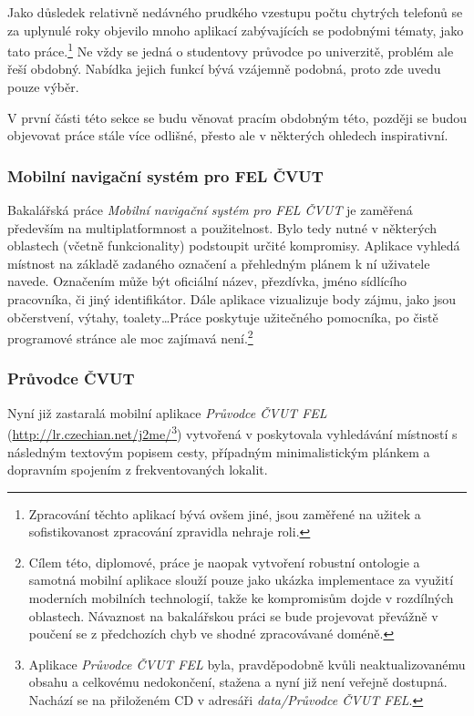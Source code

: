 Jako důsledek relativně nedávného prudkého vzestupu počtu chytrých telefonů se za uplynulé roky objevilo mnoho aplikací zabývajících se podobnými tématy, jako tato práce.\footnote{Zpracování těchto aplikací bývá ovšem jiné, jsou zaměřené na užitek a sofistikovanost zpracování zpravidla nehraje roli.} Ne vždy se jedná o studentovy průvodce po univerzitě, problém ale řeší obdobný. Nabídka jejich funkcí bývá vzájemně podobná, proto zde uvedu pouze výběr.

V první části této sekce se budu věnovat pracím obdobným této, později se budou objevovat práce stále více odlišné, přesto ale v některých ohledech inspirativní.

\subsubsection{Mobilní navigační systém pro FEL ČVUT}
Bakalářská práce \emph{Mobilní navigační systém pro FEL ČVUT} \cite{Bakalarka} je zaměřená především na multiplatformnost a použitelnost. Bylo tedy nutné v některých oblastech (včetně funkcionality) podstoupit určité kompromisy. Aplikace vyhledá místnost na základě zadaného označení a přehledným plánem k ní uživatele navede. Označením může být oficiální název, přezdívka, jméno sídlícího pracovníka, či jiný identifikátor. Dále aplikace vizualizuje body zájmu, jako jsou občerstvení, výtahy, toalety\dots Práce poskytuje užitečného pomocníka, po čistě programové stránce ale moc zajímavá není.\footnote{Cílem této, diplomové, práce je naopak vytvoření robustní ontologie a samotná mobilní aplikace slouží pouze jako ukázka implementace za využití moderních mobilních technologií, takže ke kompromisům dojde v rozdílných oblastech. Návaznost na bakalářskou práci se bude projevovat převážně v poučení se z předchozích chyb ve shodné zpracovávané doméně.}

\subsubsection{Průvodce ČVUT}
Nyní již zastaralá mobilní aplikace \emph{Průvodce ČVUT FEL} (\url{http://lr.czechian.net/j2me/}\footnote{Aplikace \emph{Průvodce ČVUT FEL} byla, pravděpodobně kvůli neaktualizovanému obsahu a celkovému nedokončení, stažena a nyní již není veřejně dostupná. Nachází se na přiloženém \gls{CD} v adresáři \textit{data/Průvodce ČVUT FEL}.}) vytvořená v  poskytovala vyhledávání místností s následným textovým popisem cesty, případným minimalistickým plánkem a dopravním spojením z frekventovaných lokalit.

